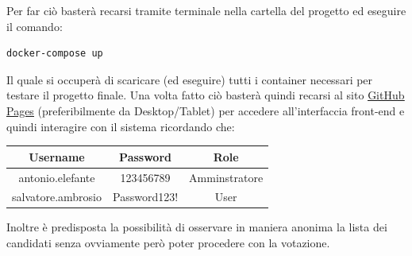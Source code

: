 \documentclass[twoside]{report}
\begin{document}
Per far ciò basterà recarsi tramite terminale nella cartella del progetto ed eseguire il comando:
\begin{listing}[h!]
\begin{verbatim}
docker-compose up
\end{verbatim} 
\end{listing}
\FloatBarrier

\bigbreak

Il quale si occuperà di scaricare (ed eseguire) tutti i container necessari per testare il progetto finale. Una volta fatto ciò basterà quindi recarsi al sito \href{https://antonioacademy10.github.io/progetto-soasec-github-pages/}{\underline{GitHub Pages}} (preferibilmente da Desktop/Tablet) per accedere all'interfaccia front-end e quindi interagire con il sistema ricordando che:
\begin{table}[h]
\centering
\begin{tabular}{|c|c|c|}
\hline
\textbf{Username} & \textbf{Password} & \textbf{Role} \\ \hline
antonio.elefante    & 123456789 & Amminstratore   \\ \hline
salvatore.ambrosio    & Password123! & User  \\ \hline
\end{tabular}
\end{table}
\FloatBarrier

Inoltre è predisposta la possibilità di osservare in maniera anonima la lista dei candidati senza ovviamente però poter procedere con la votazione.

\bigbreak
\pagestyle{empty} 
\thispagestyle{empty} 
\listoffigures
\thispagestyle{empty} 
\listoftables
\thispagestyle{empty} 
\end{document}
